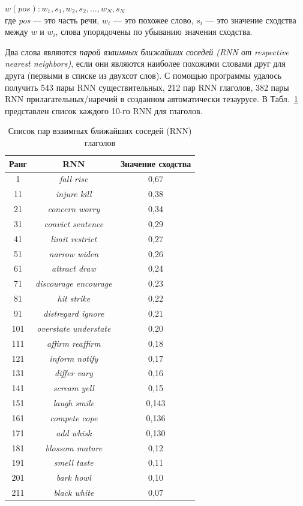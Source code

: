\documentclass{article}
\begin{document}
\begin{articletext}
$w(pos):w_1,s_1,w_2,s_2,\ldots,w_N,s_N$\\

где \textit{pos} --– это часть речи, $w_i$ ---  это похожее слово, $s_i$ --- это значение сходства между $w$ и $w_i$, слова упорядочены по убыванию значения сходства.

Два слова являются \textit{парой взаимных ближайших соседей (RNN от respective nearest neighbors)}, если они являются наиболее похожими словами друг для друга (первыми в списке из двухсот слов). С помощью программы удалось получить 543 пары RNN существительных, 212 пар RNN глаголов, 382 пары RNN прилагательных/наречий в созданном автоматически тезаурусе. В Табл.~\ref{tabshor} представлен список каждого 10-го RNN для глаголов.

\bfullwidth
\begin{table}[H]
\centering
\caption{Список пар взаимных ближайших соседей (RNN) глаголов}
\begin{tabular}{|c|c|c|}
\hline
\textbf{Ранг} & \textbf{RNN} & \textbf{Значение сходства}\\
\hline
1 & \textit{fall rise} & 0,67\\
\hline
11 & \textit{injure kill} & 0,38\\
\hline
21 & \textit{concern worry} & 0,34\\
\hline
31 & \textit{convict sentence} & 0,29\\
\hline
41 & \textit{limit restrict} & 0,27\\
\hline
51 & \textit{narrow widen} & 0,26\\
\hline
61 & \textit{attract draw} & 0,24\\
\hline
71 & \textit{discourage encourage} & 0,23\\
\hline
81 & \textit{hit strike} & 0,22\\
\hline
91 & \textit{distregard ignore} & 0,21\\
\hline
101 & \textit{overstate understate} & 0,20\\
\hline
111 & \textit{affirm reaffirm} & 0,18\\
\hline
121 & \textit{inform notify} & 0,17\\
\hline
131 & \textit{differ vary} & 0,16\\
\hline
141 & \textit{scream yell} & 0,15\\
\hline
151 & \textit{laugh smile} & 0,143\\
\hline
161 & \textit{compete cope} & 0,136\\
\hline
171 & \textit{add whisk} & 0,130\\
\hline
181 & \textit{blossom mature} & 0,12\\
\hline
191 & \textit{smell taste} & 0,11\\
\hline
201 & \textit{bark howl} & 0,10\\
\hline
211 & \textit{black white} & 0,07\\
\hline
\end{tabular}
\label{tabshor}
\end{table}
\efullwidth


\end{articletext}
\end{document}
